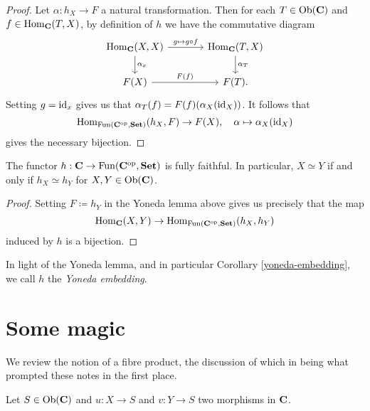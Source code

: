 \begin{proof}
  Let $\alpha : h_X \to F$ a natural transformation. Then for each $T
  \in \operatorname{Ob}(\mathbf{C})$ and $f \in \operatorname{Hom}_{\mathbf{C}}(T,X)$, by definition of $h$ we have
  the commutative diagram
  \[
  \begin{tikzcd}[column sep = large]
    \Hom_\C(X,X) \rar{g \mapsto g \circ f} \dar{\alpha_x} &
    \Hom_\C(T,X) \dar{\alpha_T} \\ F(X) \rar{F(f)} & F(T).
  \end{tikzcd}
  \]
  Setting $g = \operatorname{id}_x$
  gives us that $\alpha_T(f) = F(f)(\alpha_X(\operatorname{id}_X))$. It follows that
  \[
  \operatorname{Hom}_{\operatorname{Fun}(\mathbf{C}^{\mathrm{op}},\mathbf{Set})}(h_X, F) \to F(X), \quad \alpha \mapsto
  \alpha_X(\operatorname{id}_X)
  \]
  gives the necessary bijection.
\end{proof}

\begin{corollary}
  \label{yoneda-embedding}
  The functor $h : \mathbf{C} \to \operatorname{Fun}(\mathbf{C}^{\mathrm{op}}, \mathbf{Set})$ is fully faithful. In
  particular, $X \simeq Y$ if and only if $h_X \simeq h_Y$ for $X,Y
  \in \operatorname{Ob}(\mathbf{C})$.
\end{corollary}

\begin{proof}
  Setting $F \coloneqq h_Y$ in the Yoneda lemma above gives us
  precisely that the map
  \[
  \operatorname{Hom}_{\mathbf{C}}(X,Y) \to \operatorname{Hom}_{\operatorname{Fun}(\mathbf{C}^{\mathrm{op}},\mathbf{Set})}(h_X,h_Y)
  \]
  induced by $h$ is a bijection.
\end{proof}

\begin{remark}
  In light of the Yoneda lemma, and in particular Corollary
  \ref{yoneda-embedding}, we call $h$ the \textit{Yoneda embedding}.
\end{remark}


\section{Some magic}

We review the notion of a fibre product, the discussion of which in
\cite{gortzwedhorn} being what prompted these notes in the first
place.

\begin{situation}
  \label{fibre}
  Let $S \in \operatorname{Ob}(\mathbf{C})$ and $u : X \to S$ and $v : Y \to S$ two morphisms
  in $\mathbf{C}$.
\end{situation}

